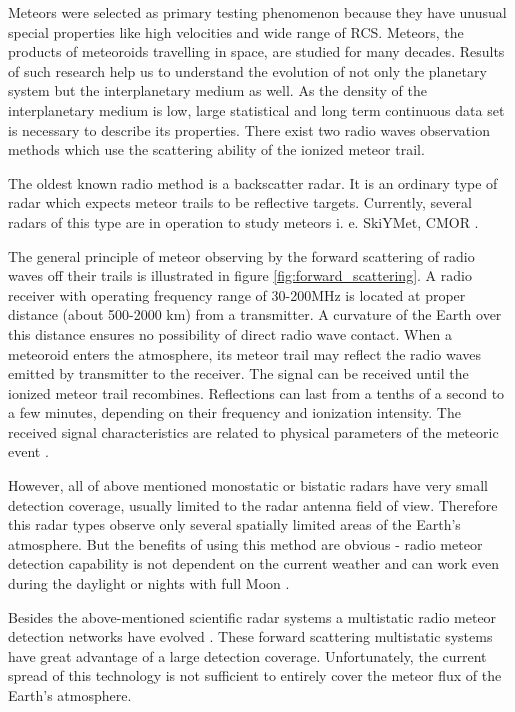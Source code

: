 \documentclass[twoside]{ctuthesis}
\theoremstyle{plain}
\theoremstyle{definition}
\theoremstyle{note}
\begin{document}
Meteors were selected as primary testing phenomenon because they have unusual special properties like high velocities and wide range of RCS. Meteors, the products of meteoroids travelling in space, are studied for many decades. Results of such research help us to understand the evolution of not only the planetary system but the interplanetary medium \cite{interplanetary_medium} as well. As the density of the interplanetary medium is low, large statistical and long term continuous data set is necessary to describe its properties. There exist two radio waves observation methods which use the scattering ability of the ionized meteor trail.

The oldest known radio method is a backscatter radar. It is an ordinary type of radar which expects meteor trails to be reflective targets. Currently, several radars of this type are in operation to study meteors i. e.  SkiYMet\cite{skiymet}, CMOR \cite{CMOR_radar}.

The general principle of meteor observing by the forward scattering of radio waves off their trails is illustrated in figure \ref{fig:forward_scattering}. A radio receiver with operating frequency range of 30-200MHz is located at proper distance (about 500-2000 km) from a transmitter. A curvature of the Earth over this distance ensures no possibility of direct radio wave contact. When a meteoroid enters the atmosphere, its meteor trail may reflect the radio waves emitted by transmitter to the receiver. The signal can be received until the ionized meteor trail recombines. Reflections can last from a tenths of a second to a few minutes, depending on their frequency and ionization intensity. The received signal characteristics are related to physical parameters of the meteoric event \cite{forward_scatter}.

However, all of above mentioned monostatic or bistatic radars have very small detection coverage, usually limited to the radar antenna field of view. Therefore this radar types observe only several spatially limited areas of the Earth's atmosphere. But the benefits of using this method are obvious - radio meteor detection capability is not dependent on the current weather and can work even during the daylight or nights with full Moon \cite{daylight_shover}.

Besides the above-mentioned scientific radar systems a multistatic radio meteor detection networks have evolved \cite{BRAMS}.
These forward scattering multistatic systems have great advantage of a large detection coverage. Unfortunately, the current spread of this technology is not sufficient to entirely cover the meteor flux of the Earth's atmosphere.
\end{document}
